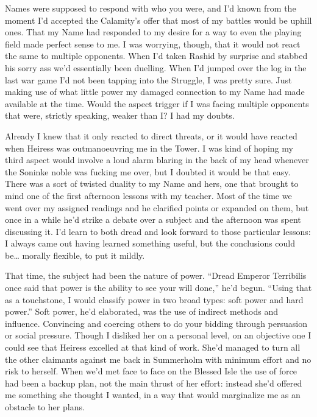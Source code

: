 \documentclass[12pt, openany]{book}
\begin{document}
Names were supposed to respond with who you were, and I’d known from the moment I’d accepted the Calamity’s offer that most of my battles would be uphill ones. That my Name had responded to my desire for a way to even the playing field made perfect sense to me. I was worrying, though, that it would not react the same to multiple opponents. When I’d taken Rashid by surprise and stabbed his sorry ass we’d essentially been duelling. When I’d jumped over the log in the last war game I’d not been tapping into the Struggle, I was pretty sure. Just making use of what little power my damaged connection to my Name had made available at the time. Would the aspect trigger if I was facing multiple opponents that were, strictly speaking, weaker than I? I had my doubts.

Already I knew that it only reacted to direct threats, or it would have reacted when Heiress was outmanoeuvring me in the Tower. I was kind of hoping my third aspect would involve a loud alarm blaring in the back of my head whenever the Soninke noble was fucking me over, but I doubted it would be that easy. There was a sort of twisted duality to my Name and hers, one that brought to mind one of the first afternoon lessons with my teacher. Most of the time we went over my assigned readings and he clarified points or expanded on them, but once in a while he’d strike a debate over a subject and the afternoon was spent discussing it. I’d learn to both dread and look forward to those particular lessons: I always came out having learned something useful, but the conclusions could be… morally flexible, to put it mildly.

That time, the subject had been the nature of power. “Dread Emperor Terribilis once said that power is the ability to see your will done,” he’d begun. “Using that as a touchstone, I would classify power in two broad types: soft power and hard power.” Soft power, he’d elaborated, was the use of indirect methods and influence. Convincing and coercing others to do your bidding through persuasion or social pressure. Though I disliked her on a personal level, on an objective one I could see that Heiress excelled at that kind of work. She’d managed to turn all the other claimants against me back in Summerholm with minimum effort and no risk to herself. When we’d met face to face on the Blessed Isle the use of force had been a backup plan, not the main thrust of her effort: instead she’d offered me something she thought I wanted, in a way that would marginalize me as an obstacle to her plans.
\end{document}
